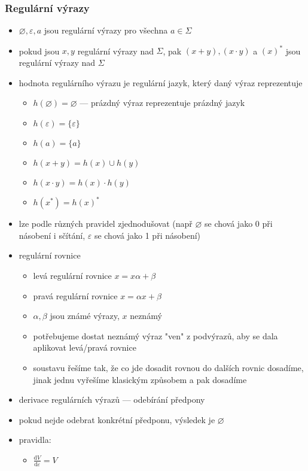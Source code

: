 \subsubsection*{Regulární výrazy}
\begin{itemize}
	\item $\varnothing, \varepsilon, a$ jsou regulární výrazy pro všechna $a \in \Sigma$
	\item pokud jsou $x, y$ regulární výrazy nad $\Sigma$, pak $(x + y), (x \cdot y)$ a $(x)^*$ jsou regulární výrazy nad $\Sigma$
	\item hodnota regulárního výrazu je regulární jazyk, který daný výraz reprezentuje
	\begin{itemize}
		\item $h(\varnothing) = \varnothing$ --- prázdný výraz reprezentuje prázdný jazyk
		\item $h(\varepsilon) = \{\varepsilon\}$
		\item $h(a) = \{a\}$
		\item $h(x + y) = h(x) \cup h(y)$
		\item $h(x\cdot y) = h(x)\cdot h(y)$
		\item $h(x^*) = h(x)^*$
	\end{itemize}
	\item lze podle různých pravidel zjednodušovat (např $\varnothing$ se chová jako 0 při násobení i sčítání, $\varepsilon$ se chová jako 1 při násobení)
	\item regulární rovnice
	\begin{itemize}
		\item levá regulární rovnice $x = x\alpha + \beta$
		\item pravá regulární rovnice $x = \alpha x + \beta$
		\item $\alpha, \beta$ jsou známé výrazy, $x$ neznámý
		\item potřebujeme dostat neznámý výraz "ven" z podvýrazů, aby se dala aplikovat levá/pravá rovnice
		\item soustavu řešíme tak, že co jde dosadit rovnou do dalších rovnic dosadíme, jinak jednu vyřešíme klasickým způsobem a pak dosadíme
	\end{itemize}
	\item derivace regulárních výrazů --- odebírání předpony 
	\item pokud nejde odebrat konkrétní předponu, výsledek je $\varnothing$
	\item pravidla:
	\begin{itemize}
		\item $\frac{\text{d}V}{\text{d}\varepsilon} = V$

\end{itemize}
\end{itemize}
